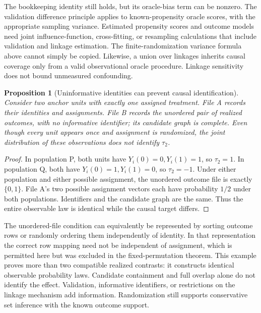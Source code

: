 \documentclass[11pt]{article}
\newtheorem{proposition}{Proposition}
\begin{document}
The bookkeeping identity still holds, but its oracle-bias term can be nonzero.
The validation difference principle applies to known-propensity oracle scores, with
the appropriate sampling variance. Estimated propensity scores and outcome models
need joint influence-function, cross-fitting, or resampling calculations that include
validation and linkage estimation. The finite-randomization variance formula above
cannot simply be copied. Likewise, a union over linkages inherits causal coverage only
from a valid observational oracle procedure. Linkage sensitivity does not bound
unmeasured confounding.

\begin{proposition}[Uninformative identities can prevent causal identification]
Consider two anchor units with exactly one assigned treatment. File A records their
identities and assignments. File B records the unordered pair of realized outcomes,
with no informative identifier; its candidate graph is complete. Even though every
unit appears once and assignment is randomized, the joint distribution of these
observations does not identify $\tau_2$.
\end{proposition}
\begin{proof}
In population P, both units have $Y_i(0)=0,Y_i(1)=1$, so $\tau_2=1$.
In population Q, both have $Y_i(0)=1,Y_i(1)=0$, so $\tau_2=-1$.
Under either population and either possible assignment, the unordered outcome file
is exactly $\{0,1\}$. File A's two possible assignment vectors each have probability
$1/2$ under both populations. Identifiers and the candidate graph are the same.
Thus the entire observable law is identical while the causal target differs.
\end{proof}
The unordered-file condition can equivalently be represented by sorting outcome rows
or randomly ordering them independently of identity. In that representation the
correct row mapping need not be independent of assignment, which is permitted here
but was excluded in the fixed-permutation theorem. This example proves more than two
compatible realized contrasts: it constructs identical observable probability laws.
Candidate containment and full overlap alone do not identify the effect. Validation,
informative identifiers, or restrictions on the linkage mechanism add information.
Randomization still supports conservative set inference with the known outcome support.
\end{document}
